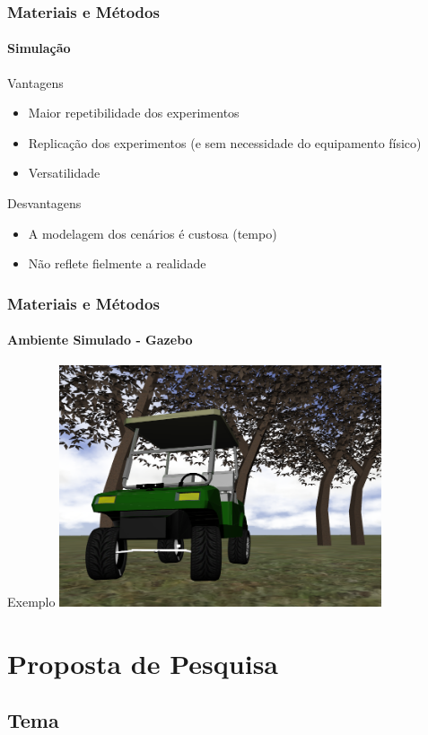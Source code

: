 \documentclass[brazil]{beamer}
\begin{document}
\begin{frame}
\frametitle{Materiais e Métodos}
\framesubtitle{Simulação}
\begin{block}{Vantagens}
\begin{itemize}
\item Maior repetibilidade dos experimentos
\item Replicação dos experimentos (e sem necessidade do equipamento físico)
\item Versatilidade
\end{itemize}
\end{block}
\begin{block}{Desvantagens}
\begin{itemize}
\item A modelagem dos cenários é custosa (tempo)
\item Não reflete fielmente a realidade
\end{itemize}
\end{block}
\end{frame}

\begin{frame}
\frametitle{Materiais e Métodos}
\framesubtitle{Ambiente Simulado - Gazebo}
Exemplo
\includegraphics[width=9.5cm,keepaspectratio]{../img/carina_gazebo_frente_fundo.png}
\end{frame}



\section{Proposta de Pesquisa}

\subsection[Tema]{Tema}

\end{document}
